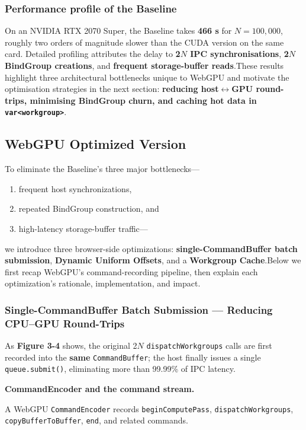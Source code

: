 \documentclass[PhD]{PHlab-thesis}
\begin{document}
\subsubsection{Performance profile of the Baseline}
On an NVIDIA RTX 2070 Super, the Baseline takes \textbf{466 s} for $N=100,000$, roughly two orders of magnitude slower than the CUDA version on the same card.
Detailed profiling attributes the delay to \textbf{2$N$ IPC synchronisations}, \textbf{2$N$ BindGroup creations}, and \textbf{frequent storage-buffer reads}.These results highlight three architectural bottlenecks unique to WebGPU and motivate the optimisation strategies in the next section: \textbf{reducing host$\leftrightarrow$GPU round-trips, minimising BindGroup churn, and caching hot data in \texttt{var<workgroup>}}.

\subsection{WebGPU Optimized Version }
To eliminate the Baseline’s three major bottlenecks—
\begin{enumerate}
    \item frequent host synchronizations,
    \item repeated BindGroup construction, and
    \item high-latency storage-buffer traffic—
\end{enumerate}
we introduce three browser-side optimizations: \textbf{single-CommandBuffer batch submission}, \textbf{Dynamic Uniform Offsets}, and a \textbf{Workgroup Cache}.Below we first recap WebGPU’s command-recording pipeline, then explain each optimization’s rationale, implementation, and impact.

\subsubsection{Single-CommandBuffer Batch Submission — Reducing CPU–GPU Round-Trips}
As \textbf{Figure 3-4} shows, the original 2$N$ \texttt{dispatchWorkgroups} calls are first recorded into the \textbf{same} \texttt{CommandBuffer}; the host finally issues a single \texttt{queue.submit()}, eliminating more than 99.99\% of IPC latency.

\textbf{CommandEncoder and the command stream.}

A WebGPU \texttt{CommandEncoder} records \texttt{beginComputePass}, \texttt{dispatchWorkgroups}, \texttt{copyBufferToBuffer}, \texttt{end}, and related commands.
\end{document}
